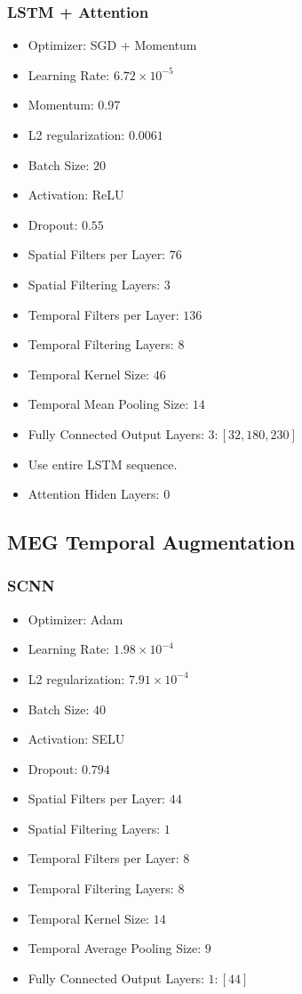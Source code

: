 \subsubsection{LSTM + Attention}

\begin{itemize}
\item Optimizer: SGD + Momentum
\item Learning Rate: $6.72 \times 10^{-5}$
\item Momentum: $0.97$
\item L2 regularization: $0.0061$
\item Batch Size: $20$
\item Activation: ReLU
\item Dropout: $0.55$
\item Spatial Filters per Layer: $76$
\item Spatial Filtering Layers: $3$
\item Temporal Filters per Layer: $136$
\item Temporal Filtering Layers: $8$
\item Temporal Kernel Size: $46$
\item Temporal Mean Pooling Size: $14$
\item Fully Connected Output Layers: $3: [32, 180, 230]$
\item Use entire LSTM sequence.
\item Attention Hiden Layers: $0$
\end{itemize}

\subsection{MEG Temporal Augmentation}

\subsubsection{SCNN}

\begin{itemize}
\item Optimizer: Adam
\item Learning Rate: $1.98 \times 10^{-4}$
\item L2 regularization: $7.91 \times 10^{-4}$
\item Batch Size: $40$
\item Activation: SELU
\item Dropout: $0.794$
\item Spatial Filters per Layer: $44$
\item Spatial Filtering Layers: $1$
\item Temporal Filters per Layer: $8$
\item Temporal Filtering Layers: $8$
\item Temporal Kernel Size: $14$
\item Temporal Average Pooling Size: $9$
\item Fully Connected Output Layers: $1: [44]$
\end{itemize}

